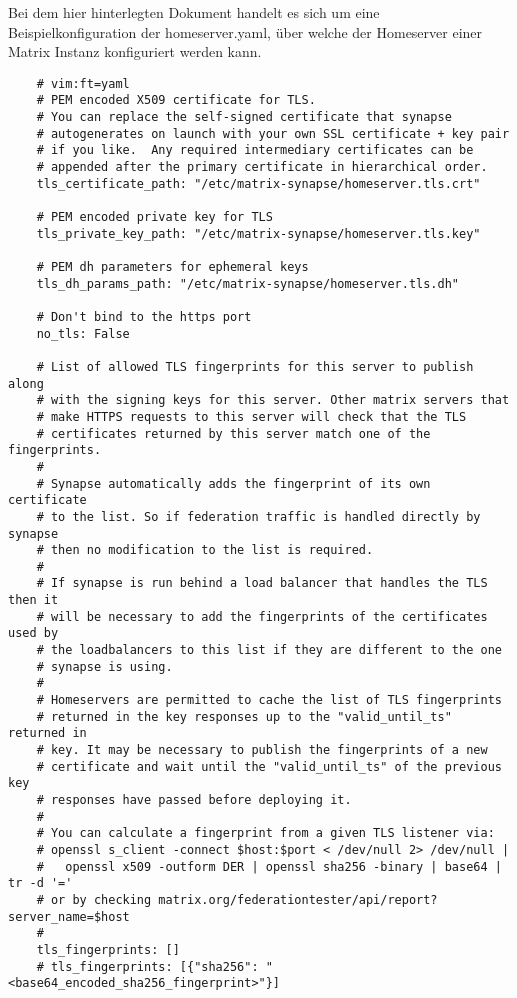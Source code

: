 Bei dem hier hinterlegten Dokument handelt es sich um eine Beispielkonfiguration der homeserver.yaml, über welche der Homeserver einer Matrix Instanz konfiguriert werden kann.

\begin{lstlisting}
    # vim:ft=yaml
    # PEM encoded X509 certificate for TLS.
    # You can replace the self-signed certificate that synapse
    # autogenerates on launch with your own SSL certificate + key pair
    # if you like.  Any required intermediary certificates can be
    # appended after the primary certificate in hierarchical order.
    tls_certificate_path: "/etc/matrix-synapse/homeserver.tls.crt"
    
    # PEM encoded private key for TLS
    tls_private_key_path: "/etc/matrix-synapse/homeserver.tls.key"
    
    # PEM dh parameters for ephemeral keys
    tls_dh_params_path: "/etc/matrix-synapse/homeserver.tls.dh"
    
    # Don't bind to the https port
    no_tls: False
    
    # List of allowed TLS fingerprints for this server to publish along
    # with the signing keys for this server. Other matrix servers that
    # make HTTPS requests to this server will check that the TLS
    # certificates returned by this server match one of the fingerprints.
    #
    # Synapse automatically adds the fingerprint of its own certificate
    # to the list. So if federation traffic is handled directly by synapse
    # then no modification to the list is required.
    #
    # If synapse is run behind a load balancer that handles the TLS then it
    # will be necessary to add the fingerprints of the certificates used by
    # the loadbalancers to this list if they are different to the one
    # synapse is using.
    #
    # Homeservers are permitted to cache the list of TLS fingerprints
    # returned in the key responses up to the "valid_until_ts" returned in
    # key. It may be necessary to publish the fingerprints of a new
    # certificate and wait until the "valid_until_ts" of the previous key
    # responses have passed before deploying it.
    #
    # You can calculate a fingerprint from a given TLS listener via:
    # openssl s_client -connect $host:$port < /dev/null 2> /dev/null |
    #   openssl x509 -outform DER | openssl sha256 -binary | base64 | tr -d '='
    # or by checking matrix.org/federationtester/api/report?server_name=$host
    #
    tls_fingerprints: []
    # tls_fingerprints: [{"sha256": "<base64_encoded_sha256_fingerprint>"}]
    

\end{lstlisting}
